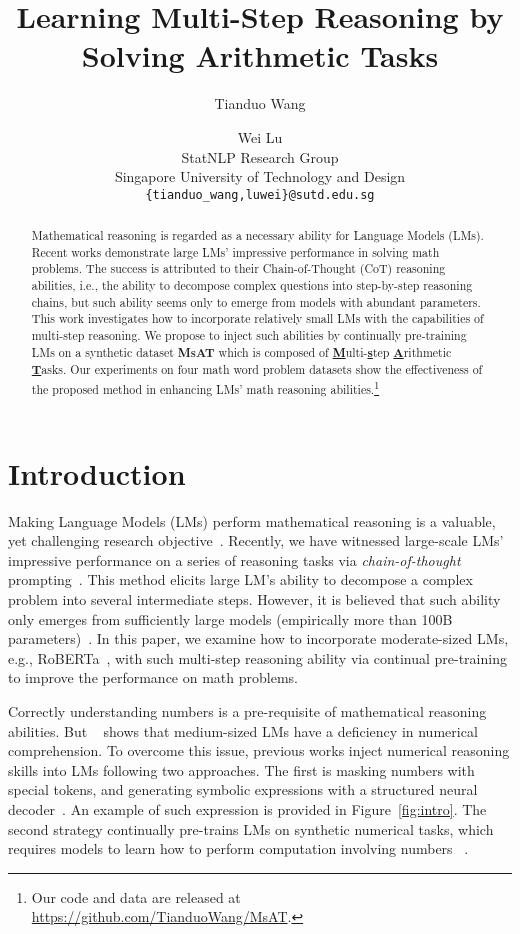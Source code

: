 \documentclass[11pt]{article}
\title{Learning Multi-Step Reasoning by Solving Arithmetic Tasks}
\author{Tianduo Wang \and Wei Lu\\
  StatNLP Research Group\\
  Singapore University of Technology and Design \\
  \texttt{\{tianduo\_wang,luwei\}@sutd.edu.sg} \\}
\newcommand\tf[1]{\textbf{#1}}
\begin{document}
\maketitle
\begin{abstract}
  Mathematical reasoning is regarded as a necessary ability for Language Models (LMs).
Recent works demonstrate large LMs' impressive performance in solving math problems.
The success is attributed to their Chain-of-Thought (CoT) reasoning abilities, 
    i.e., the ability to decompose complex questions into step-by-step reasoning chains,
    but such ability seems only to emerge from models with abundant parameters.
This work investigates how to incorporate relatively small LMs with the capabilities of multi-step reasoning.
We propose to inject such abilities by 
  continually pre-training LMs on a synthetic dataset \tf{\textsc{MsAT}} which is composed of \tf{\underline{M}}ulti-\tf{\underline{s}}tep
  \tf{\underline{A}}rithmetic \tf{\underline{T}}asks.
Our experiments on four math word problem datasets show the effectiveness of the proposed method in enhancing LMs' math reasoning abilities.\footnote{
    Our code and data are released at \url{https://github.com/TianduoWang/MsAT}.
    }
\end{abstract}

\section{Introduction}




  Making Language Models (LMs) perform mathematical reasoning is a valuable, yet challenging research objective~\cite{hendrycks2021measuring,cobbe2021gsm8k}.
Recently, we have witnessed large-scale LMs' impressive performance on a series of reasoning tasks via {\em chain-of-thought} prompting~\cite{wei2022cot}.
This method elicits large LM's ability to decompose a complex problem into several intermediate steps.
However, it is believed that such ability only emerges from sufficiently large models (empirically more than 100B parameters)~\cite{wei2022cot}.
In this paper, 
    we examine how to incorporate moderate-sized LMs,
    e.g., RoBERTa~\cite{liu2019roberta}, with such multi-step reasoning ability via continual pre-training to improve the performance on math problems.
  

  Correctly understanding numbers is a pre-requisite of mathematical reasoning abilities.
But ~\citet{wallace2019nlp} shows that medium-sized LMs have a deficiency in numerical comprehension.
To overcome this issue, previous works inject numerical reasoning skills into LMs following two approaches.
The first is masking numbers with special tokens, 
    and generating symbolic expressions with a structured neural decoder~\cite{xie2019treedecoder,jie2022deductreason}.
An example of such expression is provided in Figure~\ref{fig:intro}.
The second strategy continually pre-trains LMs on synthetic numerical tasks,
    which requires models to learn how to perform computation involving numbers ~\cite{geva2020genbert,pi2022poet}.
\end{document}
